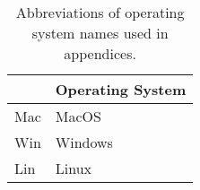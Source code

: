 \begin{table}
\centering
\caption{Abbreviations of operating system names used in appendices.}
\label{tab:keys-os}
\begin{tabular}{ll}
\toprule
{} & Operating System \\
\midrule
 Mac &            MacOS \\
 Win &          Windows \\
 Lin &            Linux \\
\bottomrule
\end{tabular}
\end{table}
\pagebreak